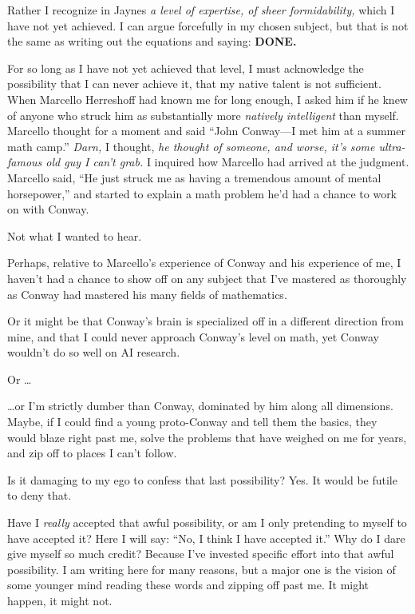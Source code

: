 {
 Rather I recognize in Jaynes \textit{a level of expertise, of
sheer formidability,} which I have not yet achieved. I can argue
forcefully in my chosen subject, but that is not the same as writing
out the equations and saying: \textbf{DONE.}}

{
 For so long as I have not yet achieved that level, I must
acknowledge the possibility that I can never achieve it, that my native
talent is not sufficient. When Marcello Herreshoff had known me for
long enough, I asked him if he knew of anyone who struck him as
substantially more \textit{natively intelligent} than myself. Marcello
thought for a moment and said ``John Conway---I met
him at a summer math camp.'' \textit{Darn,} I
thought, \textit{he thought of someone, and worse, it's
some ultra-famous old guy I can't grab.} I inquired how
Marcello had arrived at the judgment. Marcello said,
``He just struck me as having a tremendous amount of
mental horsepower,'' and started to explain a math
problem he'd had a chance to work on with Conway.}

{
 Not what I wanted to hear.}

{
 Perhaps, relative to Marcello's experience of
Conway and his experience of me, I haven't had a chance
to show off on any subject that I've mastered as
thoroughly as Conway had mastered his many fields of mathematics.}

{
 Or it might be that Conway's brain is specialized
off in a different direction from mine, and that I could never approach
Conway's level on math, yet Conway
wouldn't do so well on AI research.}

{
 Or \ldots}

{
 \ldots or I'm strictly dumber than Conway,
dominated by him along all dimensions. Maybe, if I could find a young
proto-Conway and tell them the basics, they would blaze right past me,
solve the problems that have weighed on me for years, and zip off to
places I can't follow.}

{
 Is it damaging to my ego to confess that last possibility? Yes. It
would be futile to deny that.}

{
 Have I \textit{really} accepted that awful possibility, or am I
only pretending to myself to have accepted it? Here I will say:
``No, I think I have accepted it.''
Why do I dare give myself so much credit? Because I've
invested specific effort into that awful possibility. I am writing here
for many reasons, but a major one is the vision of some younger mind
reading these words and zipping off past me. It might happen, it might
not.}

